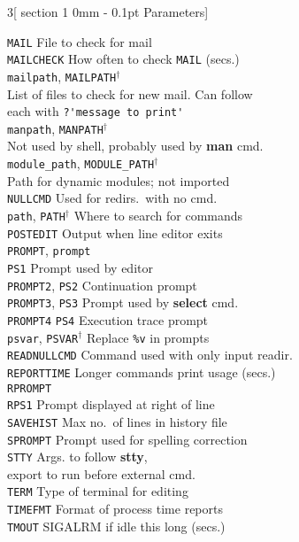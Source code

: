 \documentclass{article}
\makeatletter
\renewcommand{\section}{\@startsection
  {section}%
  {1}%
  {0mm}%
  {-\baselineskip}%
  {0.1pt}%
  {\normalfont\normalsize\scshape}} %
\newcommand\B[1]{\textbf{#1}}
\newcommand\T[1]{\texttt{#1}}
\newcommand\D{$^\dag$}
\makeatother
\begin{document}
\begin{multicols}{3}[\section{Parameters}]
\begin{tabbing}
\T{MAIL}          \>\> File to check for mail \\
\T{MAILCHECK}     \>\> How often to check \T{MAIL} (secs.) \\
\T{mailpath}, \T{MAILPATH}\D \\
   \> List of files to check for new mail.  Can follow \\
   \> each with \verb!?'message to print'! \\
\T{manpath}, \T{MANPATH}\D \\
   \> Not used by shell, probably used by \B{man} cmd. \\
\T{module\_path}, \T{MODULE\_PATH}\D \\
   \> Path for dynamic modules; not imported \\
\T{NULLCMD}       \>\> Used for redirs.\ with no cmd. \\
\T{path}, \T{PATH}\D \>\> Where to search for commands \\
\T{POSTEDIT}      \>\> Output when line editor exits \\
\T{PROMPT}, \T{prompt} \\
\T{PS1}           \>\> Prompt used by editor \\
\T{PROMPT2}, \T{PS2} \>\> Continuation prompt \\
\T{PROMPT3}, \T{PS3} \>\> Prompt used by \B{select} cmd. \\
\T{PROMPT4}  \T{PS4} \>\> Execution trace prompt \\
\T{psvar}, \T{PSVAR}\D \>\> Replace \verb!%v! in prompts \\
\T{READNULLCMD} \>\> Command used with only input readir. \\
\T{REPORTTIME} \>\> Longer commands print usage (secs.) \\
\T{RPROMPT} \\
\T{RPS1}           \>\> Prompt displayed at right of line \\
\T{SAVEHIST}       \>\> Max no.\ of lines in history file \\
\T{SPROMPT}        \>\> Prompt used for spelling correction \\
\T{STTY}           \>\> Args. to follow \B{stty}, \\
  \>\> export to run before external cmd.\ \\
\T{TERM}           \>\> Type of terminal for editing \\
\T{TIMEFMT}        \>\> Format of process time reports \\
\T{TMOUT}          \>\> SIGALRM if idle this long (secs.) \\

\end{tabbing}
\end{multicols}
\end{document}

